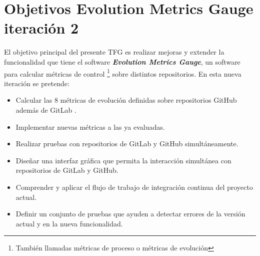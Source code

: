 \section{Objetivos Evolution Metrics Gauge iteración 2}
   
El objetivo principal del presente TFG es realizar mejoras y extender la funcionalidad que tiene el software \textit{\textbf{Evolution Metrics Gauge}}, un software para calcular métricas de control \footnote{También llamadas métricas de proceso o métricas de evolución} sobre distintos repositorios.
En esta nueva iteración se pretende:

\begin{itemize}
	\tightlist
	\item Calcular las 8 métricas de evolución definidas sobre repositorios GitHub además de GitLab .
	\item Implementar nuevas métricas a las ya evaluadas.
	\item Realizar pruebas con repositorios de GitLab y GitHub simultáneamente.
	\item Diseñar una interfaz gráfica que permita la interacción simultánea con repositorios de GitLab y GitHub.
	\item Comprender y aplicar el flujo de trabajo de integración continua del proyecto actual.
	\item Definir un conjunto de pruebas que ayuden a detectar errores de la versión actual y en la nueva funcionalidad.
\end{itemize}

\newpage


